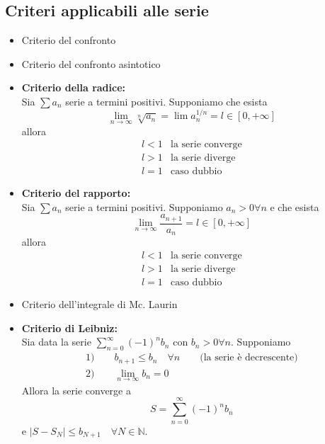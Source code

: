 \documentclass[x11names]{article}
\begin{document}
	\subsection{Criteri applicabili alle serie}
	\begin{itemize}
		\item{Criterio del confronto}
		\item{Criterio del confronto asintotico}
		\item{\textbf{Criterio della radice:}} \\
		 Sia \(\sum a_{n}\) serie a termini positivi. Supponiamo che esista
		\[ 
		\lim_{n\to \infty} \sqrt[n]{a_{n}} = \lim a^{1/n}_{n} = l \in [0,+\infty]
		\]
		allora 
		\[ 
		\begin{array}{ll}
			l<1 & \text{la serie converge} \\
			l>1 & \text{la serie diverge} \\
			l=1 & \text{caso dubbio}
		\end{array}
		\]
		\item{\textbf{Criterio del rapporto:}} \\
		 Sia \(\sum a_{n}\) serie a termini positivi. Supponiamo \(a_{n} > 0 \forall n\) e che esista
		\[ 
		\lim_{n\to \infty} \frac{a_{n+1}}{a_{n}} =  l \in [0,+\infty]
		\]
		allora 
		\[ 
		\begin{array}{ll}
			l<1 & \text{la serie converge} \\
			l>1 & \text{la serie diverge} \\
			l=1 & \text{caso dubbio}
		\end{array}
		\]
		\item{Criterio dell'integrale di Mc. Laurin}
		\item{\textbf{Criterio di Leibniz:}} \\
		Sia data la serie \(\sum_{n=0}^{\infty}(-1)^n b_{n}\) con \(b_{n} > 0 \forall n\). Supponiamo
		\[ 
		\begin{array}{l}
			1) \qquad b_{n+1} \leq b_{n} \quad \forall n \qquad \text{(la serie è decrescente)} \\
			2) \qquad \lim_{n\to\infty} b_{n} = 0
		\end{array}
		\]
		Allora la serie converge a 
		\[ 
		S = \sum_{n=0}^{\infty}(-1)^nb_{n}
		\]
		e \(|S - S_{N}| \leq b_{N+1} \quad \forall N \in \mathbb{N}\).
	\end{itemize}
		
\end{document}
